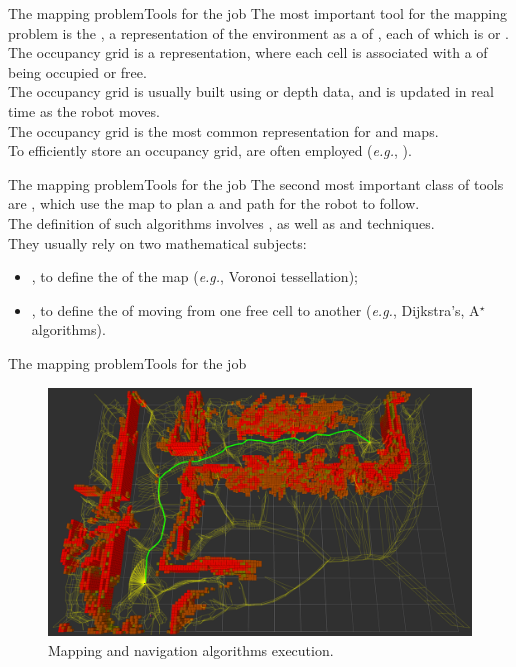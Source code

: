 \begin{frame}{The mapping problem}{Tools for the job}
  The most important tool for the mapping problem is the , a representation of the environment as a  of , each of which is  or .\\
  \bigskip
  The occupancy grid is a  representation, where each cell is associated with a  of being occupied or free.\\
  \bigskip
  The occupancy grid is usually built using  or  depth data, and is updated in real time as the robot moves.\\
  \bigskip
  The occupancy grid is the most common representation for  and  maps.\\
  \bigskip
  To efficiently store an occupancy grid,  are often employed (\emph{e.g.}, ).
\end{frame}
\begin{frame}{The mapping problem}{Tools for the job}
  The second most important class of tools are , which use the map to plan a  and  path for the robot to follow.\\
  \bigskip
  The definition of such algorithms involves , as well as  and  techniques.\\
  \bigskip
  They usually rely on two mathematical subjects:
  \begin{itemize}
    \item {}, to define the  of the map (\emph{e.g.}, Voronoi tessellation);
    \item {}, to define the  of moving from one free cell to another (\emph{e.g.}, Dijkstra's, A$^\star$ algorithms).
  \end{itemize}
\end{frame}
\begin{frame}{The mapping problem}{Tools for the job}
  \begin{figure}
    \centering
    \includegraphics[width=.65\textwidth]{navigation_stack}
    \caption{Mapping and navigation algorithms execution.}
    \label{fig:navstack}
  \end{figure}
\end{frame}
